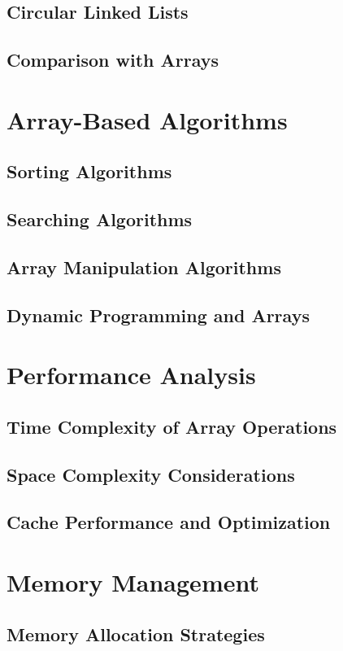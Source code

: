 \documentclass[12pt, oneside]{book}
\begin{document}
\section{Circular Linked Lists}
\section{Comparison with Arrays}

\chapter{Array-Based Algorithms}
\section{Sorting Algorithms}
\section{Searching Algorithms}
\section{Array Manipulation Algorithms}
\section{Dynamic Programming and Arrays}

\chapter{Performance Analysis}
\section{Time Complexity of Array Operations}
\section{Space Complexity Considerations}
\section{Cache Performance and Optimization}

\chapter{Memory Management}
\section{Memory Allocation Strategies}
\end{document}
